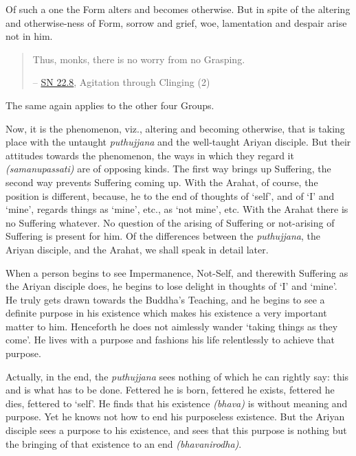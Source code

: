 Of such a one the Form alters and becomes otherwise. But in spite of the altering and otherwise-ness of Form, sorrow and grief, woe, lamentation and despair arise not in him.

\begin{quote}
Thus, monks, there is no worry from no Grasping.

 -- \href{https://suttacentral.net/sn22.8/en/bodhi}{SN 22.8}, Agitation through Clinging (2)
\end{quote}

The same again applies to the other four Groups.

Now, it is the  phenomenon, viz., altering and becoming otherwise, that is taking place with the untaught \emph{puthujjana} and the well-taught Ariyan disciple. But their attitudes towards the phenomenon, the ways in which they regard it \emph{(samanupassati)} are of opposing kinds. The first way brings up Suffering, the second way prevents Suffering coming up. With the Arahat, of course, the position is different, because, he  to the end of  thoughts of `self', and of `I' and `mine',  regards things as `mine', etc.,  as `not mine', etc. With the Arahat there is no Suffering whatever. No question of the arising of Suffering or not-arising of Suffering is present for him. Of the differences between the \emph{puthujjana}, the Ariyan disciple, and the Arahat, we shall speak in detail later.

When a person begins to see Impermanence, Not-Self, and therewith Suffering as the Ariyan disciple does, he begins to lose delight in thoughts of `I' and `mine'. He truly gets drawn towards the Buddha's Teaching, and he begins to see a definite purpose in his existence which makes his existence a very important matter to him. Henceforth he does not aimlessly wander `taking things as they come'. He lives with a purpose and fashions his life relentlessly to achieve that purpose.

Actually, in the end, the \emph{puthujjana} sees nothing of which he can rightly say: this and  is what has to be done. Fettered he is born, fettered he exists, fettered he dies, fettered to `self'. He finds that his existence \emph{(bhava)} is without meaning and purpose. Yet he knows not how to end his purposeless existence. But the Ariyan disciple sees a purpose to his existence, and sees that this purpose is nothing but the bringing of that existence to an end \emph{(bhavanirodha)}.

